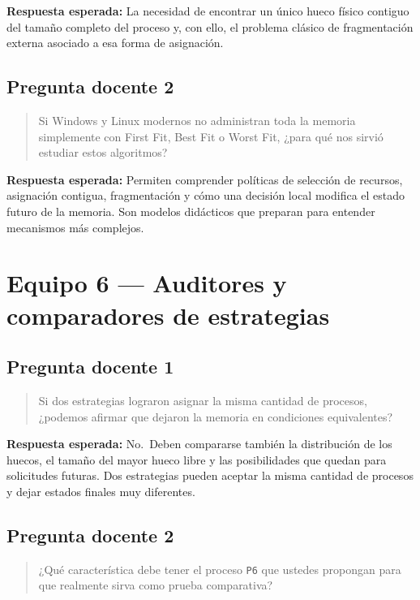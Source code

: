 \documentclass[
  spanish,
  letterpaper,
]{scrbook}
\begin{document}
\textbf{Respuesta esperada:} La necesidad de encontrar un único hueco
físico contiguo del tamaño completo del proceso y, con ello, el problema
clásico de fragmentación externa asociado a esa forma de asignación.

\subsection{Pregunta docente 2}\label{pregunta-docente-2-4}

\begin{quote}
Si Windows y Linux modernos no administran toda la memoria simplemente
con First Fit, Best Fit o Worst Fit, ¿para qué nos sirvió estudiar estos
algoritmos?
\end{quote}

\textbf{Respuesta esperada:} Permiten comprender políticas de selección
de recursos, asignación contigua, fragmentación y cómo una decisión
local modifica el estado futuro de la memoria. Son modelos didácticos
que preparan para entender mecanismos más complejos.

\section{Equipo 6 --- Auditores y comparadores de
estrategias}\label{equipo-6-auditores-y-comparadores-de-estrategias-1}

\subsection{Pregunta docente 1}\label{pregunta-docente-1-5}

\begin{quote}
Si dos estrategias lograron asignar la misma cantidad de procesos,
¿podemos afirmar que dejaron la memoria en condiciones equivalentes?
\end{quote}

\textbf{Respuesta esperada:} No.~Deben compararse también la
distribución de los huecos, el tamaño del mayor hueco libre y las
posibilidades que quedan para solicitudes futuras. Dos estrategias
pueden aceptar la misma cantidad de procesos y dejar estados finales muy
diferentes.

\subsection{Pregunta docente 2}\label{pregunta-docente-2-5}

\begin{quote}
¿Qué característica debe tener el proceso \texttt{P6} que ustedes
propongan para que realmente sirva como prueba comparativa?
\end{quote}
\end{document}
